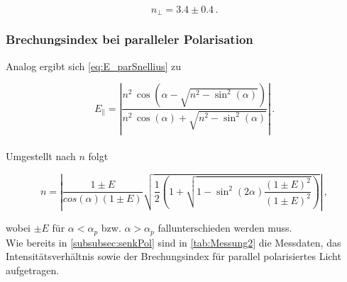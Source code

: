   \begin{equation*}
      n_\perp = 3.4 \pm 0.4 \,. 
  \end{equation*}

\subsubsection{Brechungsindex bei paralleler Polarisation}

Analog ergibt sich \eqref{eq:E_parSnellius} zu

\begin{equation*}
    E_\parallel = \left| \frac{n^2 \, \cos(\alpha - \sqrt{n^2 - \sin^2(\alpha)})}{n^2 \, \cos(\alpha) + \sqrt{n^2 - \sin^2(\alpha)}} \right| \,.
\end{equation*} \\

Umgestellt nach $n$ folgt

\begin{equation}
    n  = \left| \frac{1 \pm E}{cos(\alpha) (1 \pm E)} \sqrt{\frac{1}{2} 
    \left(1 + \sqrt{1 - \sin^2(2 \alpha) \frac{(1 \pm E)^2}{(1 \pm E)^2}} \right)} \right| \,,
\end{equation}

wobei $\pm E$ für $\alpha < \alpha_p$ bzw. $\alpha > \alpha_p$ fallunterschieden werden muss. \\

Wie bereits in \autoref{subsubsec:senkPol} sind in \autoref{tab:Messung2} die Messdaten, das Intensitätsverhältnis sowie der Brechungsindex für parallel polarisiertes Licht aufgetragen.


